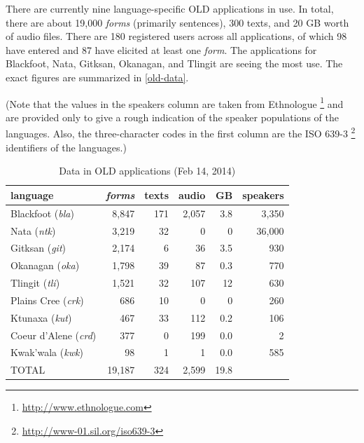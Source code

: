\documentclass[11pt]{article}
\begin{document}

There are currently nine language-specific OLD applications in use. In total,
there are about 19,000 \emph{forms} (primarily sentences), 300 texts, and 20 GB worth
of audio files.  There are 180 registered users across all applications, of
which 98 have entered and 87 have elicited at least one \emph{form}. The applications
for Blackfoot, Nata, Gitksan, Okanagan, and Tlingit are seeing the most use. The
exact figures are summarized in \autoref{old-data}.

(Note that the values in the speakers column are taken from Ethnologue%
\footnote{\url{http://www.ethnologue.com}} %
and are provided only to give a rough indication of the speaker populations of
the languages. Also, the three-character codes in the first column are the ISO
639-3%
\footnote{\url{http://www-01.sil.org/iso639-3}} %
identifiers of the languages.)


\begin{table}[h]
 \begin{center}
     \scriptsize
\begin{tabular}{lrrrrr}

      \toprule
      language &                     \emph{forms}  & texts & audio & GB   & speakers \\
      \midrule
      Blackfoot (\textit{bla}) &     8,847  & 171   & 2,057 & 3.8  & 3,350    \\ %
      Nata (\textit{ntk}) &          3,219  & 32    & 0     & 0    & 36,000   \\ %
      Gitksan (\textit{git}) &       2,174  & 6     & 36    & 3.5  & 930      \\ %
      Okanagan (\textit{oka}) &      1,798  & 39    & 87    & 0.3  & 770      \\ %
      Tlingit (\textit{tli}) &       1,521  & 32    & 107   & 12   & 630      \\ %
      Plains Cree (\textit{crk}) &   686    & 10    & 0     & 0    & 260      \\ %
      Ktunaxa (\textit{kut}) &       467    & 33    & 112   & 0.2  & 106      \\ %
      Coeur d'Alene (\textit{crd}) & 377    & 0     & 199   & 0.0  & 2        \\ %
      Kwak'wala (\textit{kwk}) &     98     & 1     & 1     & 0.0  & 585      \\ %
      TOTAL &                        19,187 & 324   & 2,599 & 19.8 &         \\ %
      \bottomrule

\end{tabular}
\caption{Data in OLD applications (Feb 14, 2014)}
\label{old-data}
 \end{center}
 \normalsize
\end{table}
\end{document}

